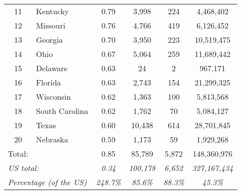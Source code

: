 \begin{table}[htbp]
\begin{tabular}{lrcccc}
    \multicolumn{1}{c}{11} & \multicolumn{1}{l}{Kentucky} & 0.79  & 3,998 & 224   & \multicolumn{1}{c}{4,468,402} \\
    
    \multicolumn{1}{c}{12} & \multicolumn{1}{l}{Missouri} & 0.76  & 4,766 & 419   & \multicolumn{1}{c}{6,126,452} \\
    
    \multicolumn{1}{c}{13} & \multicolumn{1}{l}{Georgia} & 0.70  & 3,950 & 223   & \multicolumn{1}{c}{10,519,475} \\
    
    \multicolumn{1}{c}{14} & \multicolumn{1}{l}{Ohio} & 0.67  & 5,064 & 259   & \multicolumn{1}{c}{11,689,442} \\
    
    \multicolumn{1}{c}{15} & \multicolumn{1}{l}{Delaware} & 0.63  & 24    & 2     & \multicolumn{1}{c}{967,171} \\
    
    \multicolumn{1}{c}{16} & \multicolumn{1}{l}{Florida} & 0.63  & 2,743 & 154   & \multicolumn{1}{c}{21,299,325} \\
    
    \multicolumn{1}{c}{17} & \multicolumn{1}{l}{Wisconsin} & 0.62  & 1,363 & 100   & \multicolumn{1}{c}{5,813,568} \\
    
    \multicolumn{1}{c}{18} & \multicolumn{1}{l}{South Carolina} & 0.62  & 1,762 & 70    & \multicolumn{1}{c}{5,084,127} \\
    
    \multicolumn{1}{c}{19} & \multicolumn{1}{l}{Texas} & 0.60  & 10,438 & 614   & \multicolumn{1}{c}{28,701,845} \\
    
    \multicolumn{1}{c}{20} & \multicolumn{1}{l}{Nebraska} & 0.59  & 1,173 & 59    & \multicolumn{1}{c}{1,929,268} \\
    \hline
    \multicolumn{1}{l}{Total:} &       & 0.85  & 85,789 & 5,872 & \multicolumn{1}{c}{148,360,976} \\
    
    \multicolumn{2}{l}{\textit{US total:}} & \textit{0.34} & \textit{100,178} & \textit{6,652} & \textit{327,167,434} \\
    \multicolumn{2}{l}{\textit{Percentage (of the US)}} & \textit{248.7\%} & \textit{85.6\%} & \textit{88.3\%} & \textit{45.3\%} \\
\hline
    \end{tabular}%
  \label{tab:addlabel}%
\end{table}%
